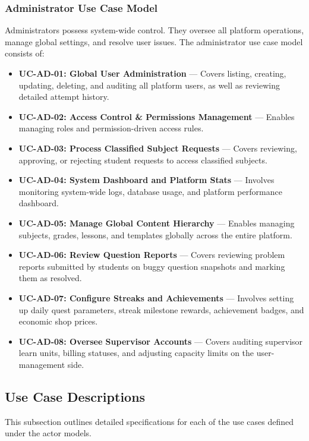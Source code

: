 \subsubsection{Administrator Use Case Model}

Administrators possess system-wide control. They oversee all platform operations, manage global settings, and resolve user issues. The administrator use case model consists of:
\begin{itemize}
  \item \textbf{UC-AD-01: Global User Administration} --- Covers listing, creating, updating, deleting, and auditing all platform users, as well as reviewing detailed attempt history.
  \item \textbf{UC-AD-02: Access Control \& Permissions Management} --- Enables managing roles and permission-driven access rules.
  \item \textbf{UC-AD-03: Process Classified Subject Requests} --- Covers reviewing, approving, or rejecting student requests to access classified subjects.
  \item \textbf{UC-AD-04: System Dashboard and Platform Stats} --- Involves monitoring system-wide logs, database usage, and platform performance dashboard.
  \item \textbf{UC-AD-05: Manage Global Content Hierarchy} --- Enables managing subjects, grades, lessons, and templates globally across the entire platform.
  \item \textbf{UC-AD-06: Review Question Reports} --- Covers reviewing problem reports submitted by students on buggy question snapshots and marking them as resolved.
  \item \textbf{UC-AD-07: Configure Streaks and Achievements} --- Involves setting up daily quest parameters, streak milestone rewards, achievement badges, and economic shop prices.
  \item \textbf{UC-AD-08: Oversee Supervisor Accounts} --- Covers auditing supervisor learn units, billing statuses, and adjusting capacity limits on the user-management side.
\end{itemize}



\subsection{Use Case Descriptions}

This subsection outlines detailed specifications for each of the use cases defined under the actor models.

